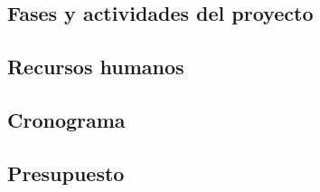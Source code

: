 \documentclass[11pt,spanish]{article}
\begin{document}
\subsection{Fases y actividades del proyecto}


\subsection{Recursos humanos}


\subsection{Cronograma}


\subsection{Presupuesto}

\end{document}
